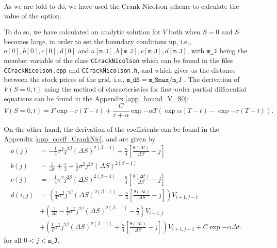 As we are told to do, we have used the Crank-Nicolson scheme to calculate the value of the option.

To do so, we have calculated an analytic solution for $V$ both when $S=0$ and $S$ becomes large, in order to set the boundary conditions up, i.e., $a[0], b[0], c[0], d[0]$ and $a[\texttt{m\_J}], b[\texttt{m\_J}], c[\texttt{m\_J}], d[\texttt{m\_J}]$, with \texttt{m\_J} being the member variable of the class \texttt{CCrackNicolson} which can be found in the files \texttt{CCrackNicolson.cpp} and \texttt{CCrackNicolson.h}, and which gives us the distance between the stock prices of the grid, i.e.,  $\texttt{m_dS} = \texttt{m_Smax} / \texttt{m_J}$ . The derivation of $V(S=0, t)$ using the method of characteristics for first-order partial differential equations can be found in the Appendix \ref{app_bound_V_S0}:
\begin{equation}\label{V_S0}
	V(S=0,t) =  F \exp{-r(T-t)} + \frac{C}{r+\alpha} \exp{-\alpha T}\left( \exp{\alpha (T-t)} -\exp{-r(T-t)} \right).
\end{equation}

On the other hand, the derivation of the coefficients can be found in the Appendix \ref{app_coeff_CrankNic}, and are given by 
\begin{equation}
	\begin{aligned}
		a(j) &= -\frac{1}{4}\sigma^2j^{2\beta}(\Delta S)^{2(\beta -1) }+ \frac{\kappa}{4}\left[\frac{\theta(\Delta t)}{\Delta S} - j\right] \\
		b(j) &= \frac{1}{\Delta t} + \frac{r}{2} + \frac{1}{2}\sigma^2 j^{2\beta}(\Delta S)^{2(\beta -1) }\\
		c(j) &=  -\frac{1}{4}\sigma^2j^{2\beta}(\Delta S)^{2(\beta -1) } - \frac{\kappa}{4}\left[\frac{\theta(\Delta t)}{\Delta S} - j\right]\\
		d(i,j)&=\left(\frac{1}{4}\sigma^2 j^{2\beta}(\Delta S)^{2(\beta -1) } - \frac{\kappa}{4}\left[\frac{\theta(\Delta t)}{\Delta S} - j\right]\right)V_{i+1,j-1}\\
		&+ \left(\frac{1}{\Delta t } - \frac{1}{2}\sigma^2 j^{2\beta}(\Delta S)^{2(\beta -1) }  - \frac{r}{2}\right)V_{i+1,j}\\
		&+ \left(\frac{1}{4}\sigma^2 j^{2\beta}(\Delta S)^{2(\beta -1) }+ \frac{\kappa}{4}\left[\frac{\theta(\Delta t)}{\Delta S} - j\right]\right)V_{i+1,j+1} + C \exp{-\alpha \Delta t}.
	\end{aligned}
\end{equation}
for all $0< j < \texttt{m_J}$.

